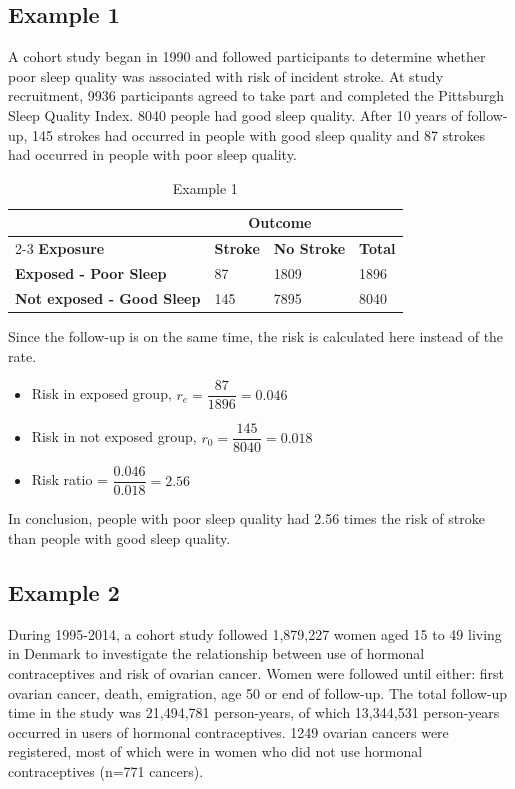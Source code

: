 \documentclass{article}
\begin{document}
\subsection{Example 1}
A cohort study began in 1990 and followed participants to determine
whether poor sleep quality was associated with risk of incident stroke. At
study recruitment, 9936 participants agreed to take part and completed
the Pittsburgh Sleep Quality Index. 8040 people had good sleep quality.
After 10 years of follow-up, 145 strokes had occurred in people with
good sleep quality and 87 strokes had occurred in people with poor sleep
quality.
\begin{table}[H]
\centering
\begin{tabularx}{\textwidth}{|X|X|X|X|}
\hline
& \multicolumn{2}{c|}{\textbf{Outcome}} & \\ \cline{2-3}
\textbf{Exposure} & \textbf{Stroke} & \textbf{No Stroke} & \textbf{Total} \\ \hline
\textbf{Exposed - Poor Sleep} & 87 & 1809 & 1896 \\ \hline
\textbf{Not exposed - Good Sleep} & 145 & 7895 & 8040 \\ \hline
\end{tabularx}
\caption{Example 1}
\label{tab:example-1}
\end{table}

Since the follow-up is on the same time, the risk is calculated here instead of the rate.
\begin{itemize}
    \item Risk in exposed group, $r_e = \dfrac{87}{1896} = 0.046$
    \item Risk in not exposed group, $r_0 = \dfrac{145}{8040} = 0.018$
    \item Risk ratio = $\dfrac{0.046}{0.018} = 2.56$
\end{itemize}
In conclusion, people with poor sleep quality had 2.56 times the risk of stroke than people with good sleep quality.

\subsection{Example 2}
During 1995-2014, a cohort study followed 1,879,227 women aged 15
to 49 living in Denmark to investigate the relationship between use of
hormonal contraceptives and risk of ovarian cancer. Women were
followed until either: first ovarian cancer, death, emigration, age 50 or
end of follow-up. The total follow-up time in the study was 21,494,781
person-years, of which 13,344,531 person-years occurred in users of
hormonal contraceptives. 1249 ovarian cancers were registered, most
of which were in women who did not use hormonal contraceptives
(n=771 cancers).
\end{document}

